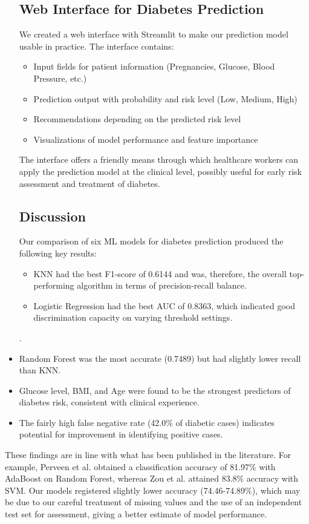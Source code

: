 \documentclass[conference]{IEEEtran}
\begin{document}
\begin{itemize}
\subsection{Web Interface for Diabetes Prediction}
We created a web interface with Streamlit to make our prediction model usable in practice. The interface contains:

\begin{itemize}
    \item Input fields for patient information (Pregnancies, Glucose, Blood Pressure, etc.)
    \item Prediction output with probability and risk level (Low, Medium, High)
    \item Recommendations depending on the predicted risk level
    \item Visualizations of model performance and feature importance
\end{itemize}

The interface offers a friendly means through which healthcare workers can apply the prediction model at the clinical level, possibly useful for early risk assessment and treatment of diabetes.

\subsection{Discussion}
Our comparison of six ML models for diabetes prediction produced the following key results:

\begin{itemize}
    \item KNN had the best F1-score of 0.6144 and was, therefore, the overall top-performing algorithm in terms of precision-recall balance.
    \item Logistic Regression had the best AUC of 0.8363, which indicated good discrimination capacity on varying threshold settings.
\end{itemize}.
\item Random Forest was the most accurate (0.7489) but had slightly lower recall than KNN.
    \item Glucose level, BMI, and Age were found to be the strongest predictors of diabetes risk, consistent with clinical experience.
    \item The fairly high false negative rate (42.0\% of diabetic cases) indicates potential for improvement in identifying positive cases.
\end{itemize}

These findings are in line with what has been published in the literature. For example, Perveen et al. \cite{perveen2016} obtained a classification accuracy of 81.97\% with AdaBoost on Random Forest, whereas Zou et al. \cite{zou2018} attained 83.8\% accuracy with SVM. Our models registered slightly lower accuracy (74.46-74.89\%), which may be due to our careful treatment of missing values and the use of an independent test set for assessment, giving a better estimate of model performance.
\end{document}
